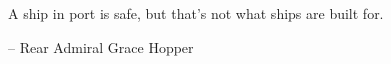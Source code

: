 \newenvironment{dedication}
  {\cleardoublepage 
   \thispagestyle{plain} 
   \vspace*{\stretch{1}} \begin{center} \em}
  {\end{center} \vspace*{\stretch{3}} \clearpage}
\begin{dedication}

A ship in port is safe, but that's not what ships are built for.

-- Rear Admiral Grace Hopper

\end{dedication}



